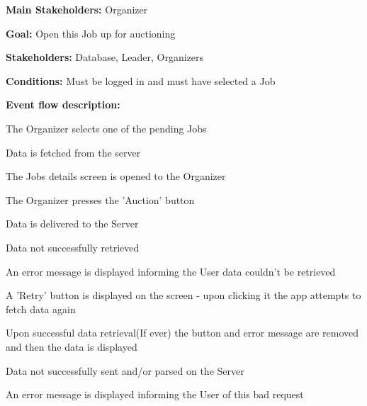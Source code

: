 			\noindent {}
			\begin{packed_item}
				\item \textbf{Main Stakeholders:} Organizer
				\item \textbf{Goal:} Open this Job up for auctioning
				\item \textbf{Stakeholders: } Database, Leader, Organizers
				\item \textbf{Conditions: } Must be logged in and must have selected a Job
				\item \textbf{Event flow description: }
				\begin{packed_enum}
					\item The Organizer selects one of the pending Jobs
					\item Data is fetched from the server
					\item The Jobs details screen is opened to the Organizer
					\item The Organizer presses the 'Auction' button
					\item Data is delivered to the Server
				\end{packed_enum}
				
				\begin{packed_item}
					
					\item[1.a] Data not successfully retrieved
					\item[] \begin{packed_enum}
						\item An error message is displayed informing the User data couldn't be retrieved
						\item A 'Retry' button is displayed on the screen - upon clicking it the app attempts to fetch data again
						\item Upon successful data retrieval(If ever) the button and error message are removed and then the data is displayed
					\end{packed_enum}
				
					\item[4.a] Data not successfully sent and/or parsed on the Server
					\item[] \begin{packed_enum}
						\item An error message is displayed informing the User of this bad request
					\end{packed_enum}
				\end{packed_item}
			\end{packed_item}
			

